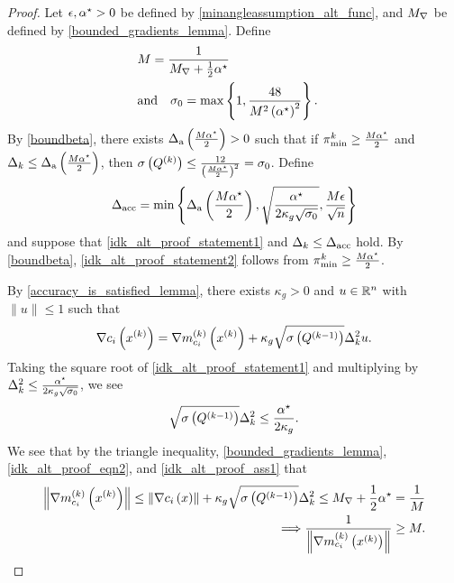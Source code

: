 \begin{proof}
Let $\epsilon, { \alpha^{\star} } > 0$ be defined by \cref{minangleassumption_alt_func}, and ${M_{\nabla}}$ be defined by \cref{bounded_gradients_lemma}.
Define
\begin{align}
&M = \frac 1 {{M_{\nabla}} + \frac 1 2 { \alpha^{\star} }} & \\
&\textrm{and} \quad \sigma_0 = \max\left\{1, \frac{48}{M^2\left({ \alpha^{\star} }\right)^2}\right\}.&
\end{align}
By \cref{boundbeta}, there exists ${\Delta_{\textrm{a}}} \left(\frac {M { \alpha^{\star} }} 2\right) > 0$ such that if
${\pi^k_{\textrm{min}}} \ge \frac {M { \alpha^{\star} }} 2$ and $\Delta_k \le {\Delta_{\textrm{a}}} \left(\frac {M { \alpha^{\star} }} 2\right)$,
then $\sigma\left({Q^{(k)}}\right) \le \frac{12}{\left(\frac{M{ \alpha^{\star} }}{2}\right)^2} = \sigma_0$.
Define 
\begin{align}
{\Delta_{\textrm{acc}}} = \min\left\{
{\Delta_{\textrm{a}}} \left(\frac {M { \alpha^{\star} }} 2\right), 
\sqrt{\frac {{ \alpha^{\star} }}{2\kappa_g\sqrt{\sigma_0}}},
\frac{M \epsilon}{\sqrt{n}}
\right\} \label{define_delta_accuracy2}
\end{align}
and suppose that \cref{idk_alt_proof_statement1} and $\Delta_k \le {\Delta_{\textrm{acc}}}$ hold.
By \cref{boundbeta}, \cref{idk_alt_proof_statement2} follows from ${\pi^k_{\textrm{min}}} \ge \frac {M { \alpha^{\star} }} 2$.


By \cref{accuracy_is_satisfied_lemma}, there exists $\kappa_{g} > 0$ and $u\in\mathbb R^n$ with $\|u\|\le 1$ such that
\begin{align}
\nabla c_i\left(x^{(k)}\right) = {\nabla m_{c_i}^{(k)}\left(x^{(k)}\right)} + \kappa_g \sqrt{\sigma\left( Q^{(k-1)} \right)}\Delta_k^2 u. \label{idk_alt_proof_eqn2}
\end{align}
Taking the square root of \cref{idk_alt_proof_statement1} and multiplying by $\Delta_k^2 \le \frac {{ \alpha^{\star} }}{2\kappa_g\sqrt{\sigma_0}}$, we see
\begin{align}
\sqrt{\sigma\left( Q^{(k-1)} \right)} \Delta_k^2 \le \frac {{ \alpha^{\star} }} {2\kappa_g}. \label{idk_alt_proof_ass1}
\end{align}
We see that by the triangle inequality, \cref{bounded_gradients_lemma}, \cref{idk_alt_proof_eqn2}, and \cref{idk_alt_proof_ass1} that
\begin{align}
\left\|{\nabla m_{c_i}^{(k)}\left(x^{(k)}\right)}\right\| \le \left\| \nabla c_i\left(x\right)\right\| + \kappa_g \sqrt{\sigma\left( Q^{(k-1)} \right)} \Delta_k^2 \le {M_{\nabla}} + \frac 1 2 { \alpha^{\star} } = \frac 1 M \nonumber \\
\Longrightarrow \frac 1 {\left\|{\nabla m_{c_i}^{(k)}\left(x^{(k)}\right)}\right\|} \ge M. \label{idk_alt_proof_eqn4}
\end{align}


\end{proof}

